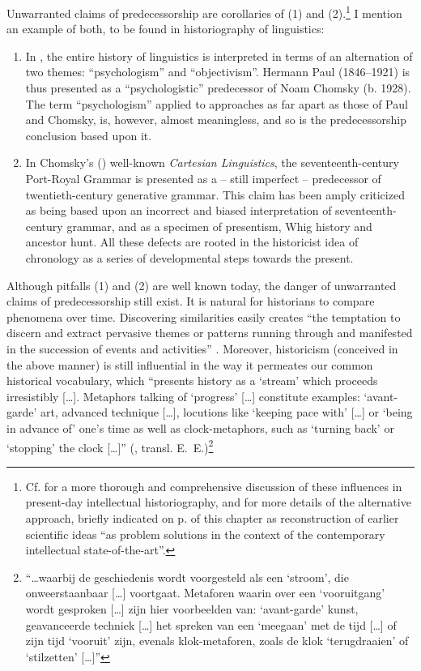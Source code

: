 \documentclass[output=paper]{langscibook}
\begin{document}
Unwarranted claims of predecessorship are corollaries of (1) and (2).\footnote{Cf. \citet[chaps. 2 \& 3]{Elffers1991} for a more thorough and comprehensive discussion of these influences in present-day intellectual historiography, and for more details of the alternative approach, briefly indicated on p. \pageref{q:elffers:probsols} of this chapter as reconstruction of earlier scientific ideas ``as problem solutions in the context of the contemporary intellectual state-of-the-art''.} I mention an example of both, to be found in historiography of linguistics:

\begin{enumerate}

\item[Ad 1.] In \citet{Antal1984}, the entire history of linguistics is interpreted in terms of an alternation of  two themes: ``psychologism'' and ``objectivism''. Hermann Paul (1846--1921) is thus presented as a ``psychologistic'' predecessor of Noam Chomsky (b. 1928). The term ``psychologism'' applied to approaches as far apart as those of Paul and Chomsky, is, however, almost meaningless, and so is the predecessorship conclusion based upon it.

\item[Ad 2.] In Chomsky’s (\citeyear{Chomsky20091966}) well-known \emph{Cartesian Linguistics}, the seventeenth-century Port-Royal Grammar is presented as a -- still imperfect -- predecessor of twentieth-century generative grammar. This claim has been amply criticized as being based upon an incorrect and biased interpretation of seven\-teenth-century grammar, and as a specimen of presentism, Whig history and ancestor hunt. All these defects are rooted in the historicist idea of chronology as a series of developmental steps towards the present. 

\end{enumerate}

Although pitfalls (1) and (2) are well known today, the danger of unwarranted claims of predecessorship still exist. It is natural for historians to compare phenomena over time. Discovering similarities easily creates ``the temptation to discern and extract pervasive themes or patterns running through and manifested in the succession of events and activities'' \citep[7--8]{Robins1997}. Moreover, historicism (conceived in the above manner) is still influential in the way it permeates our common historical vocabulary, which ``presents history as a `stream' which proceeds irresistibly […]. Metaphors talking of `progress' […] constitute examples: `avant-garde' art, advanced technique […], locutions like `keeping pace with' […] or `being in advance of' one's time as well as clock-metaphors, such as `turning back' or `stopping' the clock […]'' (\citealt[131]{Dussen1986}, transl. E.~E.)\footnote{``…waarbij de geschiedenis wordt voorgesteld als een `stroom', die onweerstaanbaar […] voortgaat. Metaforen waarin over een `vooruitgang' wordt gesproken […] zijn hier voorbeelden van: `avant-garde' kunst, geavanceerde techniek […] het spreken van een `meegaan' met de tijd […] of zijn tijd `vooruit' zijn, evenals klok-metaforen, zoals de klok `terugdraaien' of `stilzetten' […]''}
\end{document}
